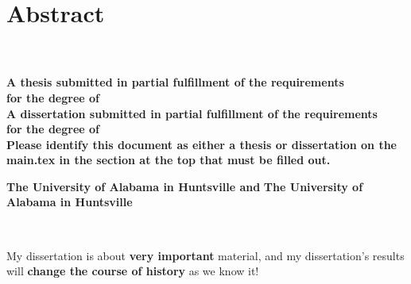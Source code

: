 
\chapter{Abstract}
     \begin{center}
        \large
        \singlespacing
        \textbf{\thesistitle}\\
        \vspace{0.5cm}
        \large
        \textbf{\studentname}\\
        \vspace{0.5cm}
        \normalsize
        \ifdefined\thesis
        \textbf{A thesis submitted in partial fulfillment of the requirements \\for the degree of \degree}\\  
        \else
        \ifdefined\dissertation
        \textbf{A dissertation submitted in partial fulfillment of the requirements \\for the degree of \degree}\\
        \else
        \textbf{Please identify this document as either a thesis or dissertation on the main.tex in the section at the top that must be filled out.}\\
    \fi
    \fi
        \vspace{1cm}
        \textbf{\department}
        
        \vspace{0.25cm}

        \ifdefined\jointuni
        \textbf{The University of Alabama in Huntsville and  \jointuni}
        \else
        \textbf{The University of Alabama in Huntsville}
    \fi

        
        \vspace{0.1cm}
        \textbf{\gradmonth\ \gradyear}
        


    \end{center}
\vspace{0.1cm}

\doublespacing
My dissertation is about \textbf{very important} material, and my dissertation’s results will \textbf{change the course of history} as we know it!

\clearpage

